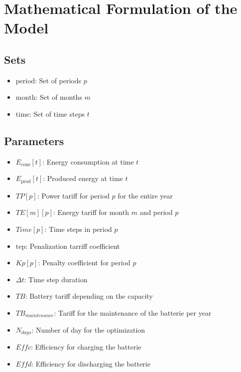 \documentclass{article}
\begin{document}
\section*{Mathematical Formulation of the Model}

\subsection*{Sets}
\begin{itemize}
    \item \( \text{period} \): Set of periods \( p \)
    \item \( \text{month} \): Set of months \( m \)
    \item \( \text{time} \): Set of time steps \( t \)
\end{itemize}

\subsection*{Parameters}
\begin{itemize}
    \item \( E_{\text{cons}}[t] \): Energy consumption at time \( t \)
    \item \( E_{\text{prod}}[t] \): Produced energy at time \( t \)
    \item \( TP[p] \): Power tariff for period \( p \) for the entire year
    \item \( TE[m][p] \): Energy tariff for month \( m \) and period \( p \)
    \item \( Time[p] \): Time steps in period \( p \)
    \item \( \text{tep} \): Penalization tarriff coefficient 
    \item \( Kp[p] \): Penalty coefficient for period \( p \)
    \item \( \Delta t \): Time step duration
    \item \( TB \): Battery tariff depending on the capacity
    \item \( TB_{maintenance} \): Tariff for the maintenance of the batterie per year
    \item \( N_{days} \): Number of day for the optimization
    \item \( Effc \): Efficiency for charging the batterie
    \item \( Effd \): Efficiency for discharging the batterie
\end{itemize}
\end{document}
